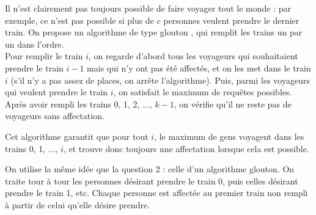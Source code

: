 

\Q
Il n'est clairement pas toujours possible de faire voyager tout le monde : par exemple, ce n'est pas possible si plus de $c$ personnes veulent prendre le dernier train. On propose un algorithme de type \og glouton \fg{}, qui remplit les trains un par un dans l'ordre.\\
Pour remplir le train $i$, on regarde d'abord tous les voyageurs qui souhaitaient prendre le train $i-1$ mais qui n'y ont pas été affectés, et on les met dans le train $i$ (s'il n'y a pas assez de places, on arrête l'algorithme). Puis, parmi les voyageurs qui veulent prendre le train $i$, on satisfait le maximum de requêtes possibles.\\
Après avoir rempli les trains 0, 1, 2, ..., $k-1$, on vérifie qu'il ne reste pas de voyageurs sans affectation.
\smallskip

Cet algorithme garantit que pour tout $i$, le maximum de gens voyagent dans les trains 0, 1, ..., $i$, et trouve donc toujours une affectation lorsque cela est possible.



\Q
On utilise la même idée que la question 2 : celle d'un algorithme glouton. On traite tour à tour les personnes désirant prendre le train 0, puis celles désirant prendre le train 1, etc. Chaque personne est affectée au premier train non rempli à partir de celui qu'elle désire prendre.


